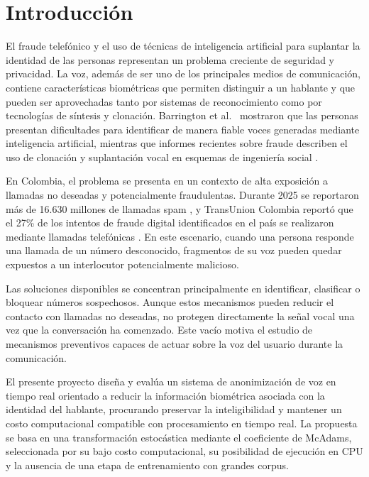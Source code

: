 \documentclass[10pt,twocolumn]{article}
\begin{document}
\section{Introducción}

El fraude telefónico y el uso de técnicas de inteligencia artificial para
suplantar la identidad de las personas representan un problema creciente de
seguridad y privacidad. La voz, además de ser uno de los principales medios de
comunicación, contiene características biométricas que permiten distinguir a un
hablante y que pueden ser aprovechadas tanto por sistemas de reconocimiento
como por tecnologías de síntesis y clonación. Barrington et al.~\cite{barrington2025}
mostraron que las personas presentan dificultades para identificar de manera
fiable voces generadas mediante inteligencia artificial, mientras que informes
recientes sobre fraude describen el uso de clonación y suplantación vocal en
esquemas de ingeniería social \cite{groupib2025}.

En Colombia, el problema se presenta en un contexto de alta exposición a
llamadas no deseadas y potencialmente fraudulentas. Durante 2025 se reportaron
más de 16.630 millones de llamadas spam \cite{acis2026}, y TransUnion Colombia
reportó que el 27\% de los intentos de fraude digital identificados en el país
se realizaron mediante llamadas telefónicas \cite{transunion2025}. En este
escenario, cuando una persona responde una llamada de un número desconocido,
fragmentos de su voz pueden quedar expuestos a un interlocutor potencialmente
malicioso.

Las soluciones disponibles se concentran principalmente en identificar,
clasificar o bloquear números sospechosos. Aunque estos mecanismos pueden
reducir el contacto con llamadas no deseadas, no protegen directamente la
señal vocal una vez que la conversación ha comenzado. Este vacío motiva el
estudio de mecanismos preventivos capaces de actuar sobre la voz del usuario
durante la comunicación.

El presente proyecto diseña y evalúa un sistema de anonimización de voz en
tiempo real orientado a reducir la información biométrica asociada con la
identidad del hablante, procurando preservar la inteligibilidad y mantener un
costo computacional compatible con procesamiento en tiempo real. La propuesta
se basa en una transformación estocástica mediante el coeficiente de McAdams,
seleccionada por su bajo costo computacional, su posibilidad de ejecución en
CPU y la ausencia de una etapa de entrenamiento con grandes corpus.
\end{document}
